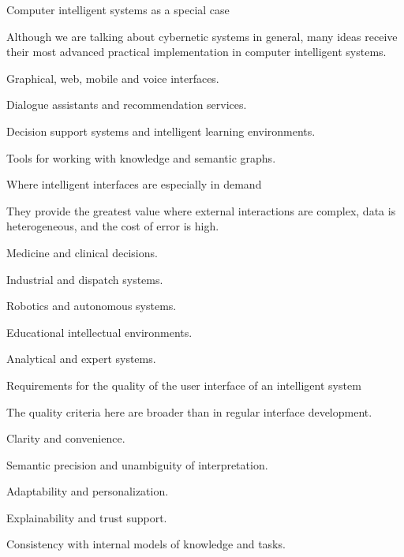 \begin{frame}{Computer intelligent systems as a special case}
	\topline
	\justifying
	
	Although we are talking about cybernetic systems in general, many ideas receive their most advanced practical implementation in computer intelligent systems.
	
	\begin{textitemize}
		\item Graphical, web, mobile and voice interfaces.
		\item Dialogue assistants and recommendation services.
		\item Decision support systems and intelligent learning environments.
		\item Tools for working with knowledge and semantic graphs.
	\end{textitemize}
\end{frame}

\begin{frame}{Where intelligent interfaces are especially in demand}
	\topline
	\justifying
	
	They provide the greatest value where external interactions are complex, data is heterogeneous, and the cost of error is high.
	
	\begin{textitemize}
		\item Medicine and clinical decisions.
		\item Industrial and dispatch systems.
		\item Robotics and autonomous systems.
		\item Educational intellectual environments.
		\item Analytical and expert systems.
	\end{textitemize}
\end{frame}

\begin{frame}{Requirements for the quality of the user interface of an intelligent system}
	\topline
	\justifying
	
	The quality criteria here are broader than in regular interface development.
	
	\begin{textitemize}
		\item Clarity and convenience.
		\item Semantic precision and unambiguity of interpretation.
		\item Adaptability and personalization.
		\item Explainability and trust support.
		\item Consistency with internal models of knowledge and tasks.
	\end{textitemize}
\end{frame}

